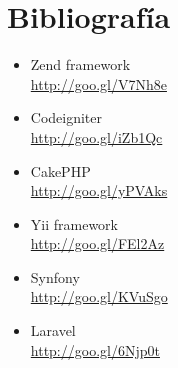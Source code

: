 \section{Bibliografía}


\begin{itemize}

\item Zend framework\\
\url{http://goo.gl/V7Nh8e}

\item Codeigniter\\
\url{http://goo.gl/iZb1Qc}

\item CakePHP \\
\url{http://goo.gl/yPVAks}

\item Yii framework \\
\url{http://goo.gl/FEl2Az}

\item Synfony \\
\url{http://goo.gl/KVuSgo}

\item Laravel \\
\url{http://goo.gl/6Njp0t}

\end{itemize}

